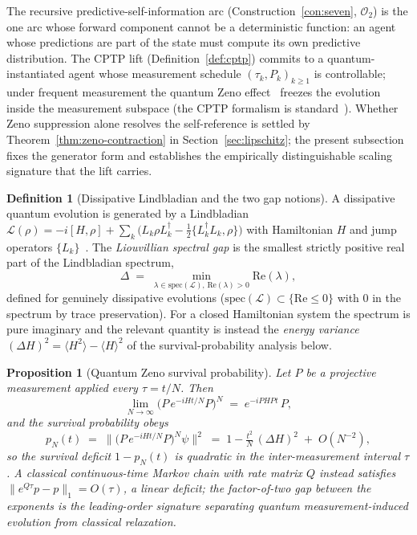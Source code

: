 \documentclass[11pt,a4paper]{article}
\theoremstyle{plain}
\newtheorem{proposition}[theorem]{Proposition}
\theoremstyle{definition}
\newtheorem{definition}[theorem]{Definition}
\theoremstyle{remark}
\newcommand{\OO}{\mathcal{O}}
\begin{document}
The recursive predictive-self-information arc
(Construction~\ref{con:seven}, $\OO_2$) is the one arc whose
forward component cannot be a deterministic function: an agent
whose predictions are part of the state must compute its own
predictive distribution. The CPTP lift (Definition~\ref{def:cptp})
commits to a quantum-instantiated agent whose measurement schedule
$(\tau_k,P_k)_{k\geq1}$ is controllable; under frequent
measurement the quantum Zeno effect~\cite{misra1977,facchi2008}
freezes the evolution inside the measurement subspace (the CPTP
formalism is standard~\cite{nielsen2000}). Whether Zeno
suppression alone resolves the self-reference is settled by
Theorem~\ref{thm:zeno-contraction} in Section~\ref{sec:lipschitz};
the present subsection fixes the generator form and establishes
the empirically distinguishable scaling signature that the lift
carries.

\begin{definition}[Dissipative Lindbladian and the two gap notions]
\label{def:lindbladian}
A dissipative quantum evolution is generated by a Lindbladian
$\mathcal L(\rho)=-i[H,\rho]+\sum_k\bigl(L_k\rho L_k^\dagger-
\tfrac12\{L_k^\dagger L_k,\rho\}\bigr)$ with Hamiltonian $H$ and
jump operators $\{L_k\}$~\cite{nielsen2000}. The \emph{Liouvillian
spectral gap} is the smallest strictly positive real part of the
Lindbladian spectrum,
\begin{equation}\label{eq:liouvillian-gap}
  \Delta \;=\; \min_{\lambda\in\mathrm{spec}(\mathcal L),\,
  \mathrm{Re}(\lambda)>0}\mathrm{Re}(\lambda),
\end{equation}
defined for genuinely dissipative evolutions ($\mathrm{spec}
(\mathcal L)\subset\{\mathrm{Re}\leq0\}$ with $0$ in the spectrum
by trace preservation). For a closed Hamiltonian system the
spectrum is pure imaginary and the relevant quantity is instead
the \emph{energy variance}
$(\Delta H)^{2}=\langle H^{2}\rangle-\langle H\rangle^{2}$ of the
survival-probability analysis below.
\end{definition}

\begin{proposition}[Quantum Zeno survival probability]
\label{prop:zeno-survival}
Let $P$ be a projective measurement applied every $\tau=t/N$.
Then
\begin{equation}\label{eq:zeno-limit}
  \lim_{N\to\infty}\bigl(P\,e^{-iHt/N}P\bigr)^{N} \;=\;
  e^{-iPHPt}\,P,
\end{equation}
and the survival probability obeys
\begin{equation}\label{eq:zeno-scaling}
  p_N(t) \;=\; \bigl\lVert\bigl(P\,e^{-iHt/N}P\bigr)^{N}\psi
  \bigr\rVert^{2} \;=\; 1-\tfrac{t^{2}}{N}\,(\Delta H)^{2} \;+\;
  O(N^{-2}),
\end{equation}
so the survival deficit $1-p_N(t)$ is quadratic in the
inter-measurement interval $\tau$. A classical continuous-time
Markov chain with rate matrix $Q$ instead satisfies
$\lVert e^{Q\tau}p-p\rVert_{1}=O(\tau)$, a linear deficit; the
factor-of-two gap between the exponents is the leading-order
signature separating quantum measurement-induced evolution from
classical relaxation.
\end{proposition}
\end{document}
